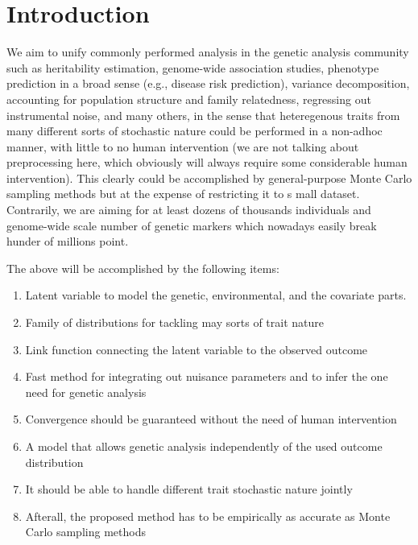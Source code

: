 \section{Introduction}

We aim to unify commonly performed analysis in the genetic analysis community such as heritability estimation, genome-wide association studies, phenotype prediction in a broad sense (e.g., disease risk prediction), variance decomposition, accounting for population structure and family relatedness, regressing out instrumental noise, and many others, in the sense that heteregenous traits from many different sorts of stochastic nature could be performed in a non-adhoc manner, with little to no human intervention (we are not talking about preprocessing here, which obviously will always require some considerable human intervention). This clearly could be accomplished by general-purpose Monte Carlo sampling methods but at the expense of restricting it to s	mall dataset. Contrarily, we are aiming for at least dozens of thousands individuals and genome-wide scale number of genetic markers which nowadays easily break hunder of millions point.

The above will be accomplished by the following items:

\begin{enumerate}
  \item Latent variable to model the genetic, environmental, and the covariate parts.
  \item Family of distributions for tackling may sorts of trait nature
  \item Link function connecting the latent variable to the observed outcome
  \item Fast method for integrating out nuisance parameters and to infer the one need for genetic analysis
  \item Convergence should be guaranteed without the need of human intervention
  \item A model that allows genetic analysis independently of the used outcome distribution
  \item It should be able to handle different trait stochastic nature jointly
  \item Afterall, the proposed method has to be empirically as accurate as Monte Carlo sampling methods
\end{enumerate}
